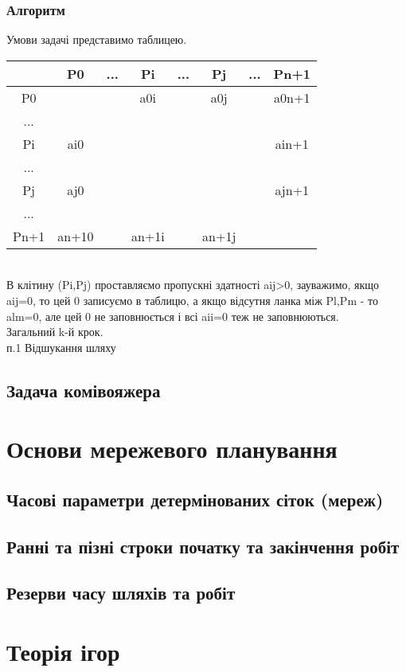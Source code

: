 \documentclass[12pt]{book}
\begin{document}
\subsection{Алгоритм}
Умови задачі представимо таблицею.\\
\begin{tabular}{ | c | c | c | c | c | c | c | c | }
\hline
	&	P0	&	...	&	Pi	&	...	&	Pj	&	...	&	Pn+1\\
\hline
P0	&		&		&	a0i	&		&	a0j	&		&	a0n+1\\
\hline
...	&		&		&		&		&		&		&\\
\hline
Pi	&	ai0	&		&		&		&		&		&	ain+1\\
\hline
...	&		&		&		&		&		&		&\\
\hline
Pj	&	aj0	&		&		&		&		&		&	ajn+1\\
\hline
...	&		&		&		&		&		&		&\\
\hline
Pn+1	&	an+10	&		&	an+1i	&		&	an+1j	&		&\\
\hline
\end{tabular}\\
В клітину (Pi,Pj) проставляємо пропускні здатності aij>0, зауважимо, якщо aij=0, то цей 0 записуємо в таблицю, а якщо відсутня ланка між Pl,Pm - то alm=0, але цей 0 не заповнюється і всі aii=0 теж не заповнюються.\\
Загальний k-й крок.\\
п.1 Відшукання шляху 
\section{Задача комівояжера}
\chapter{Основи мережевого планування}
\section{Часові параметри детермінованих сіток (мереж)}
\section{Ранні та пізні строки початку та закінчення робіт}
\section{Резерви часу шляхів та робіт}
\chapter{Теорія ігор}
\end{document}
